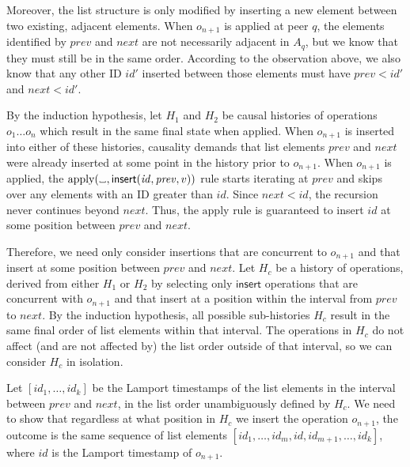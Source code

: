\documentclass[a4paper,twocolumn,10pt]{article}
\newcommand{\placeholder}{%
  \makebox[0.7em]{%
    \kern.07em
    \vrule height.3ex
    \hrulefill
    \vrule height.3ex
    \kern.07em
  }%
}
\begin{document}
Moreover, the list structure is only modified by inserting a new element between two existing, adjacent elements. When $o_{n+1}$ is applied at peer $q$, the elements identified by $\mathit{prev}$ and $\mathit{next}$ are not necessarily adjacent in $A_q$, but we know that they must still be in the same order. According to the observation above, we also know that any other ID $\mathit{id}'$ inserted between those elements must have $\mathit{prev} < \mathit{id}'$ and $\mathit{next} < \mathit{id}'$.

By the induction hypothesis, let $H_1$ and $H_2$ be causal histories of operations $o_1 \dots o_n$ which result in the same final state when applied. When $o_{n+1}$ is inserted into either of these histories, causality demands that list elements $\mathit{prev}$ and $\mathit{next}$ were already inserted at some point in the history prior to $o_{n+1}$. When $o_{n+1}$ is applied, the $\mathrm{apply}(\placeholder, \mathsf{insert}(\mathit{id}, \mathit{prev}, v))$ rule starts iterating at $\mathit{prev}$ and skips over any elements with an ID greater than $\mathit{id}$. Since $\mathit{next} < \mathit{id}$, the recursion never continues beyond $\mathit{next}$. Thus, the $\mathrm{apply}$ rule is guaranteed to insert $\mathit{id}$ at some position between $\mathit{prev}$ and $\mathit{next}$.

Therefore, we need only consider insertions that are concurrent to $o_{n+1}$ and that insert at some position between $\mathit{prev}$ and $\mathit{next}$. Let $H_c$ be a history of operations, derived from either $H_1$ or $H_2$ by selecting only $\mathsf{insert}$ operations that are concurrent with $o_{n+1}$ and that insert at a position within the interval from $\mathit{prev}$ to $\mathit{next}$. By the induction hypothesis, all possible sub-histories $H_c$ result in the same final order of list elements within that interval. The operations in $H_c$ do not affect (and are not affected by) the list order outside of that interval, so we can consider $H_c$ in isolation.

Let $[\mathit{id}_1, \dots, \mathit{id}_k]$ be the Lamport timestamps of the list elements in the interval between $\mathit{prev}$ and $\mathit{next}$, in the list order unambiguously defined by $H_c$. We need to show that regardless at what position in $H_c$ we insert the operation $o_{n+1}$, the outcome is the same sequence of list elements $[\mathit{id}_1, \dots, \mathit{id}_m, \mathit{id}, \mathit{id}_{m+1}, \dots, \mathit{id}_k]$, where $\mathit{id}$ is the Lamport timestamp of $o_{n+1}$.
\end{document}
